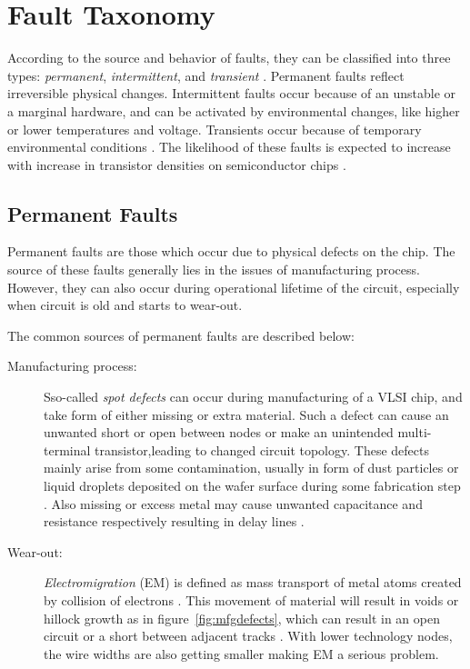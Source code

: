 \section{Fault Taxonomy}
\label{sec:secft}
According to the source and behavior of faults, they can be classified into three types: \emph{permanent}, \emph{intermittent}, and \emph{transient} \cite{Constantinescu2003}. Permanent faults reflect irreversible physical changes. Intermittent faults occur because of an unstable or a marginal hardware, and can be activated by environmental changes, like higher or lower temperatures and voltage. Transients occur because of temporary environmental conditions \cite{Constantinescu2003}. The likelihood of these faults is expected to increase with increase in transistor densities on semiconductor chips \cite{Constantinescu2007}.

\subsection{Permanent Faults}
Permanent faults are those which occur due to physical defects on the chip. The source of these faults generally lies in the issues of manufacturing process. However, they can also occur during operational lifetime of the circuit, especially when circuit is old and starts to wear-out.

The common sources of permanent faults are described below:
\begin{description}
\item[Manufacturing process:] Sso-called \emph{spot defects} can occur during manufacturing of a VLSI chip, and take form of either missing or extra material. Such a defect can cause an unwanted short or open between nodes or make an unintended multi-terminal transistor,leading to changed circuit topology. These defects mainly arise from some contamination, usually in form of dust particles or liquid droplets deposited on the wafer surface during some fabrication step \cite{Khare1996}. Also missing or excess metal may cause unwanted capacitance and resistance respectively resulting in delay lines \cite{Wagner1995}.

\item[Wear-out:] \emph{Electromigration} (EM) is defined as mass transport of metal atoms created by collision of electrons \cite{Ghate1982}. This movement of material will result in voids or hillock growth as in figure~\ref{fig:mfgdefects}, which can result in an open circuit or a short between adjacent tracks \cite{AnalogDevices2000}. With lower technology nodes, the wire widths are also getting smaller making EM a serious problem.
\end{description}

